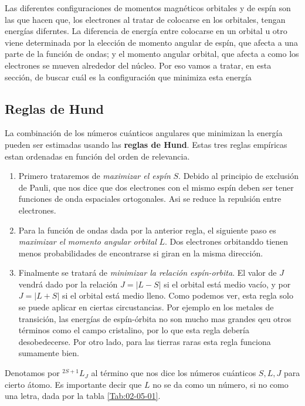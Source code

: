 \documentclass[12pt,a4paper]{book}
\numberwithin{equation}{section}
\numberwithin{figure}{section}
\begin{document}
Las diferentes configuraciones de momentos magnéticos orbitales y de espín son las que hacen que, los electrones al tratar de colocarse en los orbitales, tengan energías diferntes. La diferencia de energía entre colocarse en un orbital u otro viene determinada por la elección de momento angular de espín, que afecta a una parte de la función de ondas; y el momento angular orbital, que afecta a como los electrones se mueven alrededor del núcleo. Por eso vamos a tratar, en esta sección, de buscar cuál es la configuración que minimiza esta energía

\subsection{Reglas de Hund}

La combinación de los números cuánticos angulares que minimizan la energía pueden ser estimadas usando las \textbf{reglas de Hund}. Estas tres reglas empíricas estan ordenadas en función del orden de relevancia. 

\begin{enumerate}
    \item Primero trataremos de \textit{maximizar el espín} $S$. Debido al principio de exclusión de Pauli, que nos dice que dos electrones con el mismo espín deben ser tener funciones de onda espaciales ortogonales. Asi se reduce la repulsión entre electrones. 

    \item Para la función de ondas dada por la anterior regla, el siguiente paso es \textit{maximizar el momento angular orbital} $L$. Dos electrones orbitanddo tienen menos probabilidades de encontrarse si giran en la misma dirección. 

    \item Finalmente se tratará de \textit{minimizar la relación espín-orbita}. El valor de $J$ vendrá dado por la relación $J=|L-S|$ si el orbital está medio vacío, y por $J=|L+S|$ si el orbital está medio lleno. Como podemos ver, esta regla solo se puede aplicar en ciertas circustancias. Por ejemplo en los metales de transición, las energías de espín-órbita no son mucho mas grandes qeu otros términos como el campo cristalino, por lo que esta regla debería desobedecerse. Por otro lado, para las tierras raras esta regla funciona sumamente bien. \\
\end{enumerate}

Denotamos por $^{2S+1}L_J$ al término que nos dice los números cuánticos $S,L,J$ para cierto átomo. Es importante decir que $L$ no se da como un número, si no como una letra, dada por la tabla \ref{Tab:02-05-01}.
\end{document}
